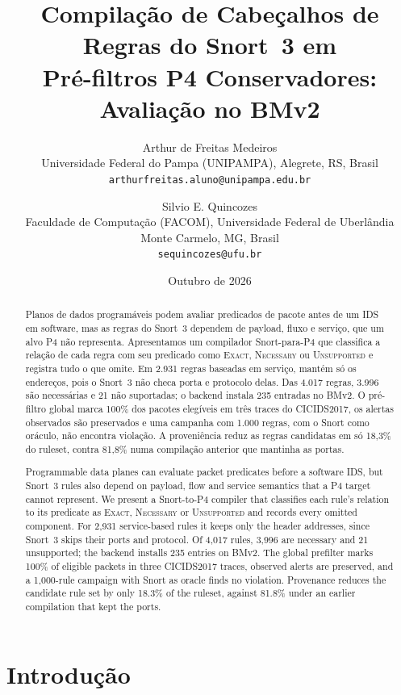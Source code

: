\documentclass[11pt,a4paper]{article}
\title{Compilação de Cabeçalhos de Regras do Snort~3 em\\
Pré-filtros P4 Conservadores: Avaliação no BMv2}
\author{
Arthur de Freitas Medeiros\\
\small Universidade Federal do Pampa (UNIPAMPA), Alegrete, RS, Brasil\\
\small\texttt{arthurfreitas.aluno@unipampa.edu.br}
\and
Silvio E. Quincozes\\
\small Faculdade de Computação (FACOM), Universidade Federal de Uberlândia\\
\small Monte Carmelo, MG, Brasil\\
\small\texttt{sequincozes@ufu.br}
}
\date{Outubro de 2026}
\newcommand{\cls}[1]{\textup{\textsc{#1}}}
\begin{document}
\maketitle

\begin{abstract}
Planos de dados programáveis podem avaliar predicados de pacote antes de um
IDS em software, mas as regras do Snort~3 dependem de payload, fluxo e
serviço, que um alvo P4 não representa. Apresentamos um compilador
Snort-para-P4 que classifica a relação de cada regra com seu predicado como
\cls{Exact}, \cls{Necessary} ou \cls{Unsupported} e registra tudo o que
omite. Em 2.931 regras baseadas em serviço, mantém só os endereços, pois o
Snort~3 não checa porta e protocolo delas. Das 4.017
regras, 3.996 são necessárias e 21 não suportadas; o backend instala 235
entradas no BMv2. O pré-filtro global marca 100\% dos pacotes elegíveis em
três traces do CICIDS2017, os alertas observados são preservados e uma
campanha com 1.000 regras, com o Snort como oráculo, não encontra violação.
A proveniência reduz as regras candidatas em só 18,3\% do ruleset, contra
81,8\% numa compilação anterior que mantinha as portas.
\end{abstract}

\begin{otherlanguage}{english}
\begin{abstract}
Programmable data planes can evaluate packet predicates before a software
IDS, but Snort~3 rules also depend on payload, flow and service semantics
that a P4 target cannot represent. We present a Snort-to-P4 compiler that
classifies each rule's relation to its predicate as \cls{Exact},
\cls{Necessary} or \cls{Unsupported} and records every omitted component.
For 2,931 service-based rules it keeps only the header addresses, since
Snort~3 skips their ports and protocol. Of 4,017 rules, 3,996 are necessary
and 21 unsupported; the backend installs 235 entries on BMv2. The global
prefilter marks 100\% of eligible packets in three CICIDS2017 traces,
observed alerts are preserved, and a 1,000-rule campaign with Snort as oracle
finds no violation. Provenance reduces the candidate rule set by only 18.3\%
of the ruleset, against 81.8\% under an earlier compilation that kept the
ports.
\end{abstract}
\end{otherlanguage}

\section{Introdução}
\end{document}
